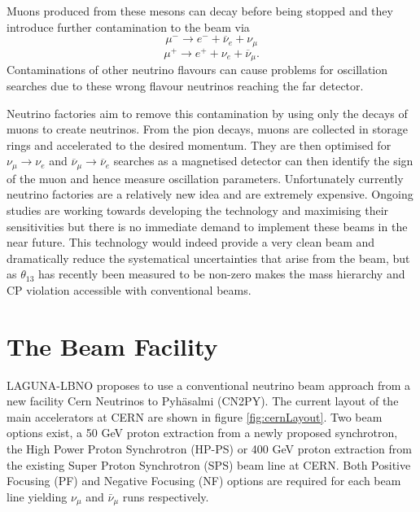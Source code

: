 Muons produced from these mesons can decay before being stopped and they introduce further contamination to the beam via
\begingroup
  \addtolength{}%
  \addtolength{}%
 \addtolength{}%
 \addtolength{}%
\begin{equation}
\mu^{-}  \rightarrow e^{-} + \overline{\nu}_{e} + \nu_{\mu} 
\end{equation}
\vspace{-2mm}
\begin{equation}
\mu^{+}  \rightarrow e^{+} + \nu_{e} + \overline{\nu}_{\mu}.
\end{equation}
\endgroup
Contaminations of other neutrino flavours can cause problems for oscillation searches due to these wrong flavour neutrinos reaching the far detector.

Neutrino factories aim to remove this contamination by using only the decays of muons to create neutrinos. From the pion decays, muons are collected in storage rings and accelerated to the desired momentum. They are then optimised for $\nu_{\mu} \rightarrow \nu_{e}$ and $\overline{\nu}_{\mu} \rightarrow \overline{\nu}_{e}$ searches as a magnetised detector can then identify the sign of the muon and hence measure oscillation parameters. Unfortunately currently neutrino factories are a relatively new idea and are extremely expensive. Ongoing studies are working towards developing the technology and maximising their sensitivities but there is no immediate demand to implement these beams in the near future. This technology would indeed provide a very clean beam and dramatically reduce the systematical uncertainties that arise from the beam, but as $\theta_{13}$ has recently been measured to be non-zero makes the mass hierarchy and CP violation accessible with conventional beams.


\section{The Beam Facility}
LAGUNA-LBNO proposes to use a conventional neutrino beam approach from a new facility Cern Neutrinos to Pyh\"asalmi (CN2PY). The current layout of the main accelerators at CERN are shown in figure \ref{fig:cernLayout}. Two beam options exist, a 50 GeV proton extraction from a newly proposed synchrotron, the High Power Proton Synchrotron (HP-PS) or 400 GeV proton extraction from the existing Super Proton Synchrotron (SPS) beam line at CERN. Both Positive Focusing (PF) and Negative Focusing (NF) options are required for each beam line yielding $\nu_{\mu}$ and $\bar{\nu}_{\mu}$ runs respectively.

